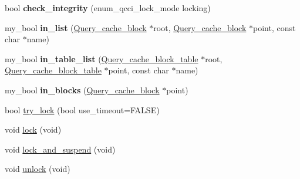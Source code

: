 \begin{DoxyCompactItemize}
bool {\bfseries check\+\_\+integrity} (enum\+\_\+qcci\+\_\+lock\+\_\+mode locking)
\item 
\mbox{\label{classQuery__cache_ada68dcccda00beca27428cfa924b3e45}} 
my\+\_\+bool {\bfseries in\+\_\+list} (\mbox{\hyperlink{structQuery__cache__block}{Query\+\_\+cache\+\_\+block}} $\ast$root, \mbox{\hyperlink{structQuery__cache__block}{Query\+\_\+cache\+\_\+block}} $\ast$point, const char $\ast$name)
\item 
\mbox{\label{classQuery__cache_ac9016e01fb25019ea073c0a8cd93a496}} 
my\+\_\+bool {\bfseries in\+\_\+table\+\_\+list} (\mbox{\hyperlink{structQuery__cache__block__table}{Query\+\_\+cache\+\_\+block\+\_\+table}} $\ast$root, \mbox{\hyperlink{structQuery__cache__block__table}{Query\+\_\+cache\+\_\+block\+\_\+table}} $\ast$point, const char $\ast$name)
\item 
\mbox{\label{classQuery__cache_a9f7637c8f64a10ab85db480eea511976}} 
my\+\_\+bool {\bfseries in\+\_\+blocks} (\mbox{\hyperlink{structQuery__cache__block}{Query\+\_\+cache\+\_\+block}} $\ast$point)
\item 
bool \mbox{\hyperlink{classQuery__cache_af6f115d2cdd660b8a92dc7943926a1ee}{try\+\_\+lock}} (bool use\+\_\+timeout=F\+A\+L\+SE)
\item 
void \mbox{\hyperlink{classQuery__cache_a5b961e23b944723d4dbdc278ad8cee9c}{lock}} (void)
\item 
void \mbox{\hyperlink{classQuery__cache_ac89ccc6622e7b96b09a24ac6e43f4364}{lock\+\_\+and\+\_\+suspend}} (void)
\item 
void \mbox{\hyperlink{classQuery__cache_affb7d26533e0ed4ea0cbe1347c582bc7}{unlock}} (void)
\end{DoxyCompactItemize}
